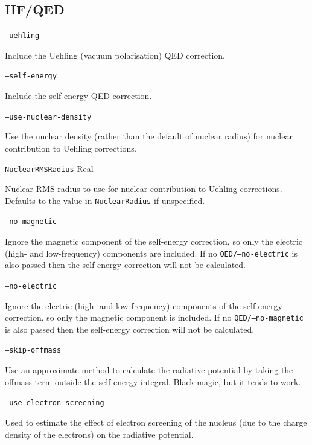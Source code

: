 \documentclass{report}
\begin{document}
\subsection{HF/QED}
\texttt{--uehling}
\begin{adjustwidth}{1cm}{}
Include the Uehling (vacuum polarisation) QED correction.
\end{adjustwidth}

\texttt{--self-energy}
\begin{adjustwidth}{1cm}{}
Include the self-energy QED correction.
\end{adjustwidth}

\texttt{--use-nuclear-density}
\begin{adjustwidth}{1cm}{}
Use the nuclear density (rather than the default of nuclear radius) for nuclear contribution to Uehling 
corrections.
\end{adjustwidth}

\texttt{NuclearRMSRadius} \uline{Real}
\begin{adjustwidth}{1cm}{}
Nuclear RMS radius to use for nuclear contribution to Uehling corrections. Defaults to the value in 
\texttt{NuclearRadius} if unspecified.
\end{adjustwidth}

\texttt{--no-magnetic}
\begin{adjustwidth}{1cm}{}
Ignore the magnetic component of the self-energy correction, so only the electric (high- and
low-frequency) components are included. If no \texttt{QED/--no-electric} is also passed then the self-energy
correction will not be calculated.
\end{adjustwidth}

\texttt{--no-electric}
\begin{adjustwidth}{1cm}{}
Ignore the electric (high- and low-frequency) components of the self-energy correction, so only the
magnetic component is included. If no \texttt{QED/--no-magnetic} is also passed then the self-energy
correction will not be calculated.
\end{adjustwidth}

\texttt{--skip-offmass}
\begin{adjustwidth}{1cm}{}
Use an approximate method to calculate the radiative potential by taking the offmass term outside the self-energy integral.
Black magic, but it tends to work.
\end{adjustwidth}

\texttt{--use-electron-screening}
\begin{adjustwidth}{1cm}{}
Used to estimate the effect of electron screening of the nucleus (due to the charge density of the electrons)
on the radiative potential.
\end{adjustwidth}
\end{document}
